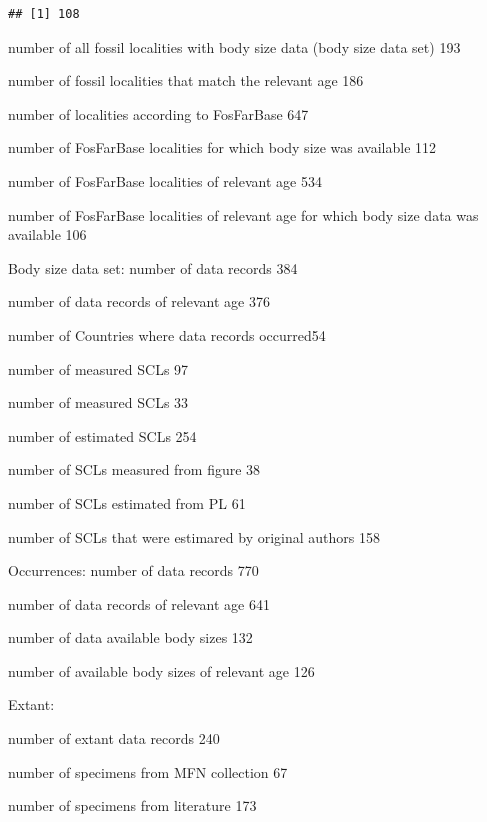 \documentclass[]{article}
\newenvironment{Shaded}{\begin{snugshade}}{\end{snugshade}}
\newcommand{\KeywordTok}[1]{\textcolor[rgb]{0.13,0.29,0.53}{\textbf{{#1}}}}
\newcommand{\StringTok}[1]{\textcolor[rgb]{0.31,0.60,0.02}{{#1}}}
\newcommand{\NormalTok}[1]{{#1}}
\begin{document}
\begin{Shaded}
\end{Shaded}

\begin{verbatim}
## [1] 108
\end{verbatim}

number of all fossil localities with body size data (body size data set)
193

number of fossil localities that match the relevant age 186

number of localities according to FosFarBase 647

number of FosFarBase localities for which body size was available 112

number of FosFarBase localities of relevant age 534

number of FosFarBase localities of relevant age for which body size data
was available 106

Body size data set: number of data records 384

number of data records of relevant age 376

number of Countries where data records occurred54

number of measured SCLs 97

number of measured SCLs 33

number of estimated SCLs 254

number of SCLs measured from figure 38

number of SCLs estimated from PL 61

number of SCLs that were estimared by original authors 158

Occurrences: number of data records 770

number of data records of relevant age 641

number of data available body sizes 132

number of available body sizes of relevant age 126

Extant:

number of extant data records 240

number of specimens from MFN collection 67

number of specimens from literature 173
\end{document}
